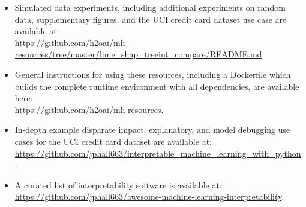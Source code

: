 \documentclass[sigconf, review]{acmart}
\begin{document}
\begin{itemize}

	\item Simulated data experiments, including additional experiments on random data, supplementary figures, and the UCI credit card dataset use case are available at:\\
	
		\url{https://github.com/h2oai/mli-resources/tree/master/lime_shap_treeint_compare/README.md}.\\ 
	      
	\item General instructions for using these resources, including a Dockerfile which builds the complete runtime environment with all dependencies, are available here:\\
	      
		\url{https://github.com/h2oai/mli-resources}.\\

	\item In-depth example disparate impact, explanatory, and model debugging use cases for the UCI credit card dataset are available at:\\ 
	
		\url{https://github.com/jphall663/interpretable_machine_learning_with_python}.\\

	\item A curated list of interpretability software is available at:\\
	
		 \url{https://github.com/jphall663/awesome-machine-learning-interpretability}.

\end{itemize}
\end{document}
